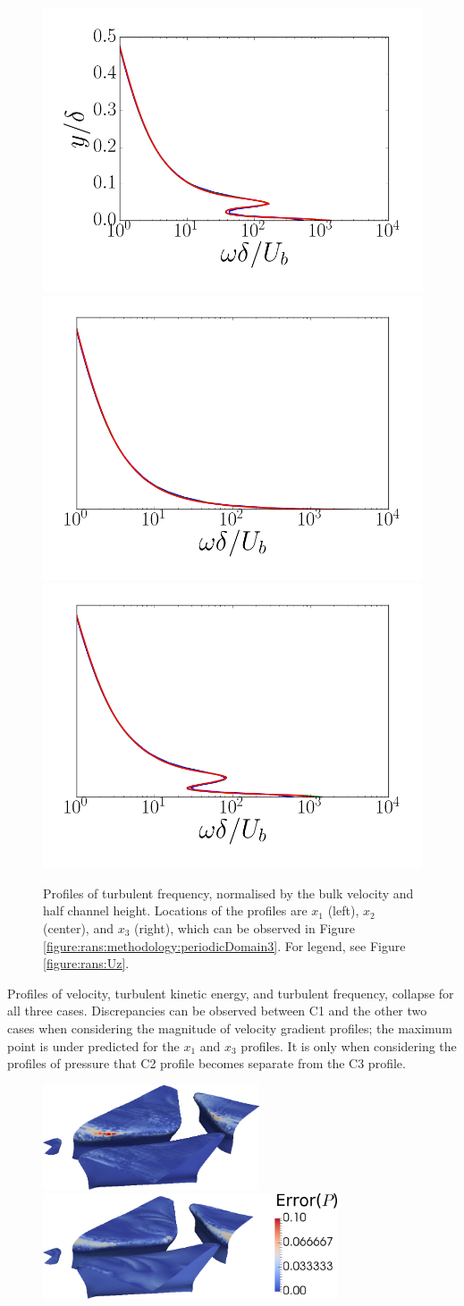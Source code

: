 \documentclass[12pt,oneside,a4paper]{article}
\begin{document}
\begin{figure}
\centering
\includegraphics[width=0.33\linewidth]{images/CFD_meshIndependence/X1_omega.png}\hfill \includegraphics[width=0.33\linewidth]{images/CFD_meshIndependence/X2_omega.png}\hfill
\includegraphics[width=0.33\linewidth]{images/CFD_meshIndependence/X3_omega.png}\hfill\caption{Profiles of turbulent frequency, normalised by the bulk velocity and half channel height. Locations of the profiles are $x_1$ (left), $x_2$ (center), and $x_3$ (right), which can be observed in Figure \ref{figure:rans:methodology:periodicDomain3}. For legend, see Figure \ref{figure:rans:Uz}.}
\label{figure:rans:omega}
\end{figure}
Profiles of velocity, turbulent kinetic energy, and turbulent frequency, collapse for all three cases. Discrepancies can be observed between C1 and the other two cases when considering the magnitude of velocity gradient profiles; the maximum point is under predicted for the $x_1$ and $x_3$ profiles. It is only when considering the profiles of pressure that C2 profile becomes separate from the C3 profile.

\begin{figure}
\centering
\includegraphics[height=3.1cm]{images/CFD_meshIndependence/tc3_p.png}\hfill \includegraphics[height=3.1cm]{images/CFD_meshIndependence/tc5_p_bar.png}
\end{figure}
\end{document}
